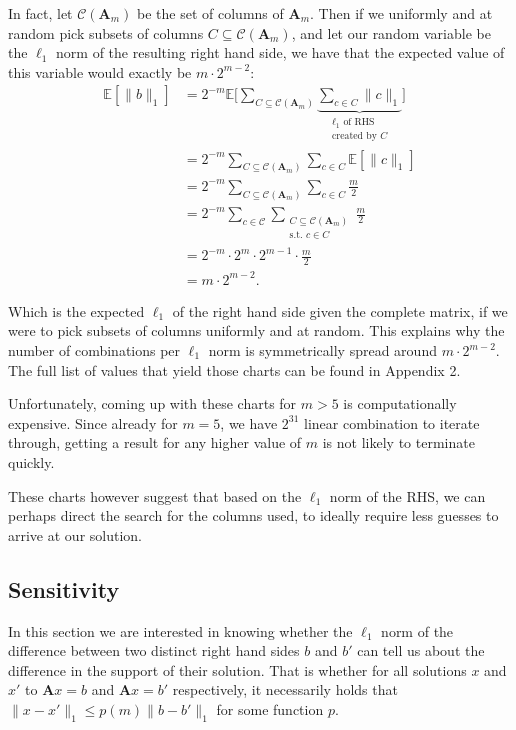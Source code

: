 \documentclass{article}
\newcommand\norm[1]{\lVert#1\rVert}
\begin{document}
In fact, let $ \mathcal{C}(\mathbf{A}_m) $ be the set of columns of $ \mathbf{A}_m $. Then if we uniformly and at random pick subsets of columns $C \subseteq \mathcal{C}(\mathbf{A}_m) $, and let our random variable be the $ \ell_1 $ norm of the resulting right hand side, we have that the expected value of this variable would exactly be $m\cdot2^{m-2}$:
\begin{align*}
\mathbb{E}\left[\norm{b}_1\right] &= 2^{-m}\mathbb{E}\Bigg[\sum_{C \subseteq \mathcal{C}(\mathbf{A}_m)} \underbrace{\sum_{c \in C} \norm{c}_1}_{\substack{\ell_1 \text{ of RHS} \\ \text{created by } C}}\Bigg]  \\
&= 2^{-m}\sum_{C \subseteq \mathcal{C}(\mathbf{A}_m)}\sum_{c \in C} \mathbb{E}\left[\norm{c}_1\right]\\
&= 2^{-m}\sum_{C \subseteq \mathcal{C}(\mathbf{A}_m)}\sum_{c \in C}
\frac{m}{2}\\
&= 2^{-m}\sum_{c \in \mathcal{C}}\sum_{\substack{C \subseteq \mathcal{C}(\mathbf{A}_m) \\ \text{s.t. } c \in C}}  \frac{m}{2}\\
&= 2^{-m}\cdot 2^m \cdot 2^{m-1} \cdot \frac{m}{2}\\
&= m \cdot 2^{m-2}.
\end{align*}

Which is the expected $ \ell_1 $ of the right hand side given the complete matrix, if we were to pick subsets of columns uniformly and at random. This explains why the number of combinations per $ \ell_1 $ norm is symmetrically spread around $ m  \cdot 2^{m-2}$. The full list of values that yield those charts can be found in Appendix 2.

Unfortunately, coming up with these charts for $ m>5 $ is computationally expensive. Since already for $ m=5 $, we have $ 2^{31} $ linear combination to iterate through, getting a result for any higher value of $ m $ is not likely to terminate quickly. 

These charts however suggest that based on the $ \ell_1 $ norm of the RHS, we can perhaps direct the search for the columns used, to ideally require less guesses to arrive at our solution. 


\subsection{Sensitivity}
In this section we are interested in knowing whether the $\ell_1$ norm of the difference between two distinct right hand sides $b$ and $b'$ can tell us about the difference in the support of their solution. That is whether for all solutions $x$ and $x'$ to $\mathbf{A}x = b$ and $\mathbf{A}x = b'$ respectively, it necessarily holds that $\norm{x-x'}_1 \leq p(m)\norm{b-b'}_1$ for some function $ p $.
\end{document}
